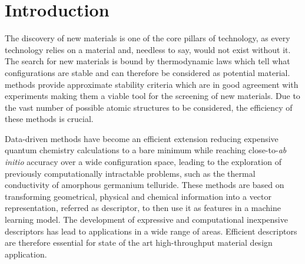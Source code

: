 \cleardoublepage
\chapter*{Introduction}

The discovery of new materials is one of the core pillars of technology, as
every technology relies on a material and, needless to say, would not exist
without it\cite{tomellini2013commentary}.
The search for new materials is bound by thermodynamic laws which tell what
configurations are stable and can therefore be considered as potential
material.
methods provide approximate stability criteria which are in good agreement with
experiments\cite{jansen2015conceptual} making them a viable tool for the
screening of new materials\cite{ceder1998identification, andersson2006toward,
yang2012search, gomez2016design}.  Due to the vast number of possible atomic
structures to be considered, the efficiency of these methods is crucial.

Data-driven methods have become an efficient extension reducing expensive
quantum chemistry calculations to a bare minimum while reaching
close-to-\textit{ab initio} accuracy over a wide configuration
space\cite{bartok2018machine}, leading to the exploration of previously
computationally intractable problems, such as the thermal conductivity of
amorphous germanium telluride\cite{sosso2012thermal}.  These methods are based
on transforming geometrical, physical and chemical information into a vector
representation, referred as descriptor, to then use it as features in a machine
learning model.  The development of expressive and computational inexpensive
descriptors\cite{behler2011atom, bartok2013representing} has lead to
applications in a wide range of areas\cite{mansouri2018machine,
sosso2018understanding, basdogan2019machine}.  Efficient descriptors are
therefore essential for state of the art high-throughput material design
application.

